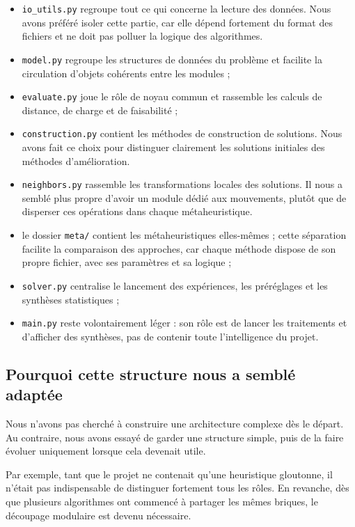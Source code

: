 \documentclass[11pt,a4paper]{article}
\begin{document}
\begin{itemize}
    \item \texttt{io\_utils.py} regroupe tout ce qui concerne la lecture des données. Nous avons préféré isoler cette partie, car elle dépend fortement du format des fichiers et ne doit pas polluer la logique des algorithmes.
    \item \texttt{model.py} regroupe les structures de données du problème et facilite la circulation d'objets cohérents entre les modules ;
    \item \texttt{evaluate.py} joue le rôle de noyau commun et rassemble les calculs de distance, de charge et de faisabilité ;
    \item \texttt{construction.py} contient les méthodes de construction de solutions. Nous avons fait ce choix pour distinguer clairement les solutions initiales des méthodes d'amélioration.
    \item \texttt{neighbors.py} rassemble les transformations locales des solutions. Il nous a semblé plus propre d'avoir un module dédié aux mouvements, plutôt que de disperser ces opérations dans chaque métaheuristique.
    \item le dossier \texttt{meta/} contient les métaheuristiques elles-mêmes ; cette séparation facilite la comparaison des approches, car chaque méthode dispose de son propre fichier, avec ses paramètres et sa logique ;
    \item \texttt{solver.py} centralise le lancement des expériences, les préréglages et les synthèses statistiques ;
    \item \texttt{main.py} reste volontairement léger : son rôle est de lancer les traitements et d'afficher des synthèses, pas de contenir toute l'intelligence du projet.
\end{itemize}

\subsection{Pourquoi cette structure nous a semblé adaptée}
Nous n'avons pas cherché à construire une architecture complexe dès le départ. Au contraire, nous avons essayé de garder une structure simple, puis de la faire évoluer uniquement lorsque cela devenait utile.

Par exemple, tant que le projet ne contenait qu'une heuristique gloutonne, il n'était pas indispensable de distinguer fortement tous les rôles. En revanche, dès que plusieurs algorithmes ont commencé à partager les mêmes briques, le découpage modulaire est devenu nécessaire.
\end{document}
